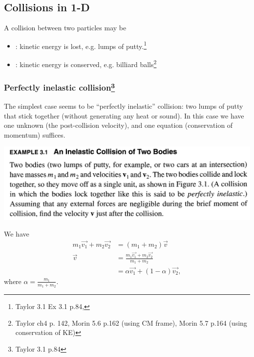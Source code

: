 \subsection*{Collisions in 1-D}

A collision between two particles may be
\begin{itemize}
\item {}: kinetic energy is lost, e.g. lumps of putty.\footnote{Taylor 3.1 Ex 3.1 p.84, }
\item {}: kinetic energy is conserved, e.g. billiard balls\footnote{Taylor ch4 p. 142, Morin 5.6 p.162 (using CM frame), Morin 5.7 p.164 (using conservation of KE)}
\end{itemize}

\subsubsection*{Perfectly inelastic collision\footnote{Taylor 3.1 p.84}}

The simplest case seems to be ``perfectly inelastic'' collision: two lumps of putty that stick
together (without generating any heat or sound). In this case we have one unknown (the
post-collision velocity), and one equation (conservation of momentum) suffices.


\begin{mdframed}
  \includegraphics[width=400pt]{img/physics--classical-mechanics--taylor--sec-3-1.png}
\end{mdframed}

We have
\begin{align*}
  m_1\vec{v_1} + m_2\vec{v_2} &= (m_1 + m_2)\vec{v} \\
  \vec{v} &= \frac{m_1\vec{v_1} + m_2\vec{v_2}}{m_1 + m_2} \\
          &= \alpha\vec{v_1} + (1 - \alpha)\vec{v_2},
\end{align*}
where $\alpha = \frac{m_1}{m_1 + m_2}$.


